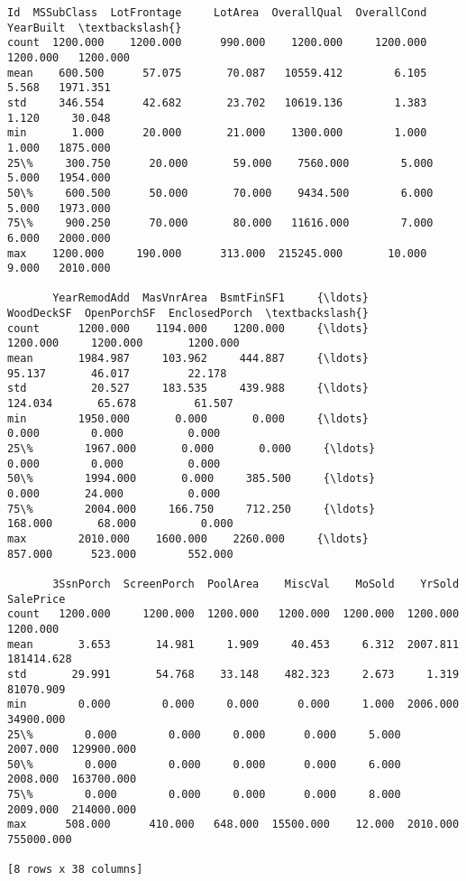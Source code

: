 \documentclass[11pt]{article}
\begin{document}
    \begin{Verbatim}[commandchars=\\\{\}]
             Id  MSSubClass  LotFrontage     LotArea  OverallQual  OverallCond  YearBuilt  \textbackslash{}
count  1200.000    1200.000      990.000    1200.000     1200.000     1200.000   1200.000   
mean    600.500      57.075       70.087   10559.412        6.105        5.568   1971.351   
std     346.554      42.682       23.702   10619.136        1.383        1.120     30.048   
min       1.000      20.000       21.000    1300.000        1.000        1.000   1875.000   
25\%     300.750      20.000       59.000    7560.000        5.000        5.000   1954.000   
50\%     600.500      50.000       70.000    9434.500        6.000        5.000   1973.000   
75\%     900.250      70.000       80.000   11616.000        7.000        6.000   2000.000   
max    1200.000     190.000      313.000  215245.000       10.000        9.000   2010.000   

       YearRemodAdd  MasVnrArea  BsmtFinSF1     {\ldots}      WoodDeckSF  OpenPorchSF  EnclosedPorch  \textbackslash{}
count      1200.000    1194.000    1200.000     {\ldots}        1200.000     1200.000       1200.000   
mean       1984.987     103.962     444.887     {\ldots}          95.137       46.017         22.178   
std          20.527     183.535     439.988     {\ldots}         124.034       65.678         61.507   
min        1950.000       0.000       0.000     {\ldots}           0.000        0.000          0.000   
25\%        1967.000       0.000       0.000     {\ldots}           0.000        0.000          0.000   
50\%        1994.000       0.000     385.500     {\ldots}           0.000       24.000          0.000   
75\%        2004.000     166.750     712.250     {\ldots}         168.000       68.000          0.000   
max        2010.000    1600.000    2260.000     {\ldots}         857.000      523.000        552.000   

       3SsnPorch  ScreenPorch  PoolArea    MiscVal    MoSold    YrSold   SalePrice  
count   1200.000     1200.000  1200.000   1200.000  1200.000  1200.000    1200.000  
mean       3.653       14.981     1.909     40.453     6.312  2007.811  181414.628  
std       29.991       54.768    33.148    482.323     2.673     1.319   81070.909  
min        0.000        0.000     0.000      0.000     1.000  2006.000   34900.000  
25\%        0.000        0.000     0.000      0.000     5.000  2007.000  129900.000  
50\%        0.000        0.000     0.000      0.000     6.000  2008.000  163700.000  
75\%        0.000        0.000     0.000      0.000     8.000  2009.000  214000.000  
max      508.000      410.000   648.000  15500.000    12.000  2010.000  755000.000  

[8 rows x 38 columns]

    \end{Verbatim}
\end{document}
